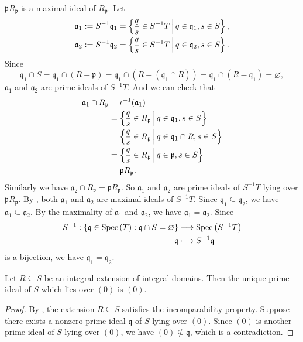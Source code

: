 \begin{prf}
\begin{enumerate}[(i)]
        $\mathfrak{p}R_\mathfrak{p}$ is a maximal ideal of $R_\mathfrak{p}$. Let 
        \begin{align*}
            \mathfrak{a}_1&:=S^{-1}\mathfrak{q}_1=\left\{\frac{q}{s}\in S^{-1}T\,\middle\vert\, q\in \mathfrak{q}_1, s\in S\right\},\\
            \mathfrak{a}_2&:=S^{-1}\mathfrak{q}_2=\left\{\frac{q}{s}\in S^{-1}T\,\middle\vert\, q\in \mathfrak{q}_2, s\in S\right\}.
        \end{align*}
        Since 
        \[
            \mathfrak{q}_1\cap S=\mathfrak{q}_1\cap (R-\mathfrak{p})=\mathfrak{q}_1\cap(R-(\mathfrak{q}_1\cap R))=\mathfrak{q}_1\cap\left(R-\mathfrak{q}_1\right)=\varnothing,
        \]
        $\mathfrak{a}_1$ and $\mathfrak{a}_2$ are prime ideals of $S^{-1}T$. And we can check that
        \begin{align*}
            \mathfrak{a}_1\cap R_\mathfrak{p}&=\iota^{-1}(\mathfrak{a}_1)\\
            &=\left\{\frac{q}{s}\in R_\mathfrak{p}\,\middle\vert\, q\in \mathfrak{q}_1, s\in S\right\}\\
            &=\left\{\frac{q}{s}\in R_\mathfrak{p}\,\middle\vert\, q\in \mathfrak{q}_1\cap R, s\in S\right\}\\
            &=\left\{\frac{q}{s}\in R_\mathfrak{p}\,\middle\vert\, q\in \mathfrak{p}, s\in S\right\}\\
            &=\mathfrak{p}R_\mathfrak{p}.
        \end{align*}
        Similarly we have $\mathfrak{a}_2\cap R_\mathfrak{p}=\mathfrak{p}R_\mathfrak{p}$. So $\mathfrak{a}_1$ and $\mathfrak{a}_2$ are prime ideals of $S^{-1}T$ lying over $\mathfrak{p}R_\mathfrak{p}$. By , both $\mathfrak{a}_1$ and $\mathfrak{a}_2$ are maximal ideals of $S^{-1}T$. Since $\mathfrak{q}_1\subseteq \mathfrak{q}_2$, we have $\mathfrak{a}_1\subseteq \mathfrak{a}_2$. By the maximality of $\mathfrak{a}_1$ and $\mathfrak{a}_2$, we have $\mathfrak{a}_1=\mathfrak{a}_2$. Since 
        \begin{align*}
            S^{-1}:\left\{\mathfrak{q} \in \operatorname{Spec}\left(T\right): \mathfrak{q} \cap S=\varnothing\right\} &\longrightarrow
           \operatorname{Spec}\left(S^{-1}T\right)\\
            \mathfrak{q} &\longmapsto S^{-1}\mathfrak{q}
        \end{align*}
        is a bijection, we have $\mathfrak{q}_1=\mathfrak{q}_2$.\\
    \end{enumerate}
\end{prf}
\begin{corollary}{}{}
    Let $R\subseteq S$ be an integral extension of integral domains. Then the unique prime ideal of $S$ which lies over $(0)$ is $(0)$.
\end{corollary}
\begin{proof}
    By , the extension $R\subseteq S$ satisfies the incomparability property. Suppose there exists a nonzero prime ideal $\mathfrak{q}$ of $S$ lying over $(0)$. Since $(0)$ is another prime ideal of $S$ lying over $(0)$, we have $(0)\not\subseteq \mathfrak{q}$, which is a contradiction.
\end{proof}

